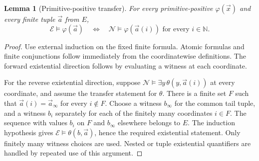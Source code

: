 \documentclass[11pt,letterpaper]{article}
\newtheorem{lemma}[theorem]{Lemma}
\theoremstyle{definition}\newtheorem{definition}[theorem]{Definition}
\theoremstyle{remark}\newtheorem{remark}[theorem]{Remark}
\begin{document}
\begin{lemma}[Primitive-positive transfer]
\label{lem:pp-transfer}
For every primitive-positive $\varphi(\vec x)$ and every finite tuple
$\vec a$ from $E$,
\[
 \mathcal E\models\varphi(\vec a)
 \quad\Longleftrightarrow\quad
 \mathcal N\models\varphi(\vec a(i))
                 \text{ for every }i\in\mathbb N.
 \tag{PP}\label{eq:pp-transfer}
\]
\end{lemma}
\begin{proof}
Use external induction on the fixed finite formula.  Atomic formulas
and finite conjunctions follow immediately from the coordinatewise
definitions.  The forward existential direction follows by evaluating
a witness at each coordinate.

For the reverse existential direction, suppose
$\mathcal N\models\exists y\,\theta(y,\vec a(i))$ at every
coordinate, and assume the transfer statement for $\theta$.  There is
a finite set $F$ such that $\vec a(i)=\vec a_\infty$ for every
$i\notin F$.  Choose a witness $b_\infty$ for the common tail tuple,
and a witness $b_i$ separately for each of the finitely many coordinates
$i\in F$.  The sequence with values $b_i$ on $F$ and $b_\infty$
elsewhere belongs to $E$.  The induction hypothesis gives
$\mathcal E\models\theta(b,\vec a)$, hence the required
existential statement.  Only finitely many witness choices are used.
Nested or tuple existential quantifiers are handled by repeated use of
this argument.
\end{proof}
\end{document}
